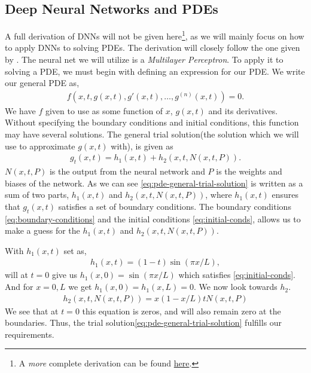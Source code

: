 \subsection{Deep Neural Networks and PDEs}
A full derivation of DNNs will not be given here\footnote{A \textit{more} complete derivation can be found \href{https://github.com/hmvege/StatML/blob/master/doc/backpropagation.pdf}{here}.}, as we will mainly focus on how to apply DNNs to solving PDEs. The derivation will closely follow the one given by \citet{hein-odenn}. The neural net we will utilize is a \textit{Multilayer Perceptron}. To apply it to solving a PDE, we must begin with defining an expression for our PDE. We write our general PDE as,
\begin{align}
    f\left( x, t, g(x, t), g'(x, t), \dots, g^{(n)}(x, t) \right) = 0.
    \label{eq:pde-general}
\end{align}
We have $f$ given to use as some function of $x$, $g(x, t)$ and its derivatives. Without specifying the boundary conditions and initial conditions, this function may have several solutions\cite{boas_mathematical_2006}. The general trial solution(the solution which we will use to approximate $g(x, t)$ with), is given as
\begin{align}
    g_t(x,t) = h_1(x,t) + h_2 (x, t, N(x, t, P)).
    \label{eq:pde-general-trial-solution}
\end{align}
$N(x, t, P)$ is the output from the neural network and $P$ is the weights and biases of the network. As we can see \eqref{eq:pde-general-trial-solution} is written as a sum of two parts, $h_1(x, t)$ and $h_2(x, t, N(x, t, P))$, where $h_1(x, t)$ ensures that $g_t(x, t)$ satisfies a set of boundary conditions\cite{lagaris_artificial_1998}. The boundary conditions \eqref{eq:boundary-conditions} and the initial conditions \eqref{eq:initial-conds}, allows us to make a guess for the $h_1(x, t)$ and $h_2(x, t, N(x, t, P))$.

With $h_1(x, t)$ set as,
\begin{align}
    h_1 (x, t) = (1 - t) \sin (\pi x / L),
    \label{eq:h1}
\end{align}
will at $t=0$ give us $h_1(x,0) = \sin(\pi x / L)$ which satisfies \eqref{eq:initial-conds}. And for $x=0, L$ we get $h_1(x,0)=h_1(x,L)=0$. We now look towards $h_2$.
\begin{align}
    h_2(x,t,N(x,t,P)) = x (1 - x/L)t N(x, t, P)
    \label{eq:h2}
\end{align}
We see that at $t=0$ this equation is zeros, and will also remain zero at the boundaries. Thus, the trial solution\eqref{eq:pde-general-trial-solution} fulfills our requirements.


